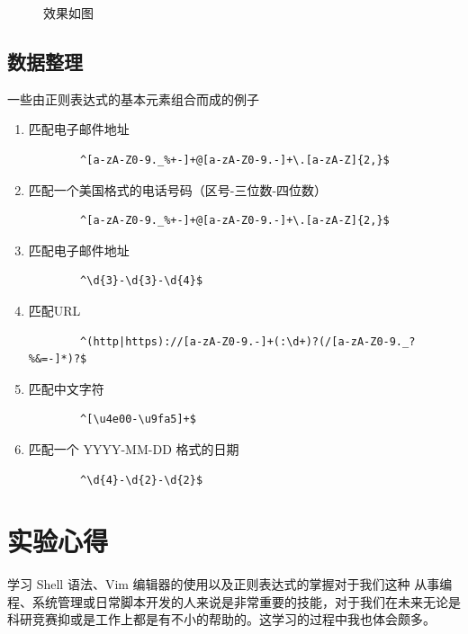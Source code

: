 \documentclass{ctexart}
\begin{document}
\begin{enumerate}
\begin{figure}[H]
        \caption{效果如图}
        \label{fig:2}
    \end{figure}


\end{enumerate}
\subsection{数据整理}
一些由正则表达式的基本元素组合而成的例子
\begin{enumerate}
    \item 匹配电子邮件地址
    \begin{lstlisting}
        ^[a-zA-Z0-9._%+-]+@[a-zA-Z0-9.-]+\.[a-zA-Z]{2,}$
        \end{lstlisting}

    \item 匹配一个美国格式的电话号码（区号-三位数-四位数）
    \begin{lstlisting}
        ^[a-zA-Z0-9._%+-]+@[a-zA-Z0-9.-]+\.[a-zA-Z]{2,}$
        \end{lstlisting}

    \item 匹配电子邮件地址
    \begin{lstlisting}
        ^\d{3}-\d{3}-\d{4}$
        \end{lstlisting}

    \item 匹配URL
    \begin{lstlisting}
        ^(http|https)://[a-zA-Z0-9.-]+(:\d+)?(/[a-zA-Z0-9._?%&=-]*)?$
        \end{lstlisting}

        \item 匹配中文字符
    \begin{lstlisting}
        ^[\u4e00-\u9fa5]+$
        \end{lstlisting}

        \item 匹配一个 YYYY-MM-DD 格式的日期
    \begin{lstlisting}
        ^\d{4}-\d{2}-\d{2}$
        \end{lstlisting}
\end{enumerate}
\section{实验心得}
学习 Shell 语法、Vim 编辑器的使用以及正则表达式的掌握对于我们这种
从事编程、系统管理或日常脚本开发的人来说是非常重要的技能，对于我们在未来无论是
科研竞赛抑或是工作上都是有不小的帮助的。这学习的过程中我也体会颇多。
\end{document}
